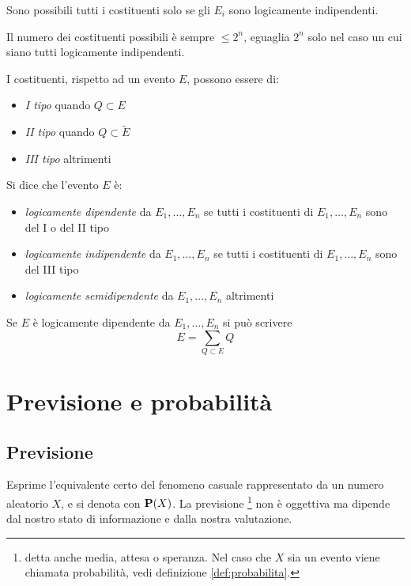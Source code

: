 Sono possibili tutti i costituenti solo se gli $E_i$ sono logicamente indipendenti.

Il numero dei costituenti possibili è sempre \( \leq 2^n \), eguaglia \( 2^n \) solo nel caso un cui siano tutti logicamente indipendenti.

\begin{definition}
  I costituenti, rispetto ad un evento $E$, possono essere di:
  \begin{itemize}
  \item \emph{I tipo} quando \( Q \subset E \)

  \item \emph{II tipo} quando \( Q \subset \tilde{E} \)

  \item \emph{III tipo} altrimenti
  \end{itemize}
\end{definition}

\begin{definition}
  Si dice che l'evento $E$ è:
  \begin{itemize}
  \item \emph{logicamente dipendente} da \( E_1, \ldots, E_n \) se tutti i costituenti di \( E_1, \ldots, E_n \) sono del I o del II tipo
  \item \emph{logicamente indipendente} da \( E_1, \ldots, E_n \) se tutti i costituenti di \( E_1, \ldots, E_n \) sono del III tipo
  \item \emph{logicamente semidipendente} da \( E_1, \ldots, E_n \) altrimenti
  \end{itemize}
\end{definition}

Se $E$ è logicamente dipendente da \( E_1, \ldots, E_n \) si può scrivere
\[ E = \sum_{Q \subset E} Q \]

\section{Previsione e probabilità}
\subsection{Previsione}
\begin{definition}[Previsione]
  Esprime l'equivalente certo del fenomeno casuale rappresentato da un numero aleatorio $X$, e si denota con $\mathbf{P}(X)$. La previsione
  \footnote{detta anche media, attesa o speranza.
    Nel caso che $X$ sia un evento viene chiamata probabilità, vedi definizione \ref{def:probabilita}.}
  non è oggettiva ma dipende dal nostro stato di informazione e dalla nostra valutazione.
\end{definition}

